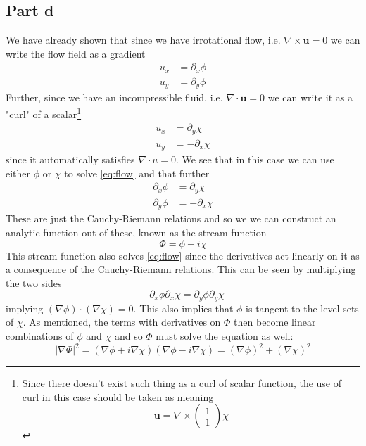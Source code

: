 \documentclass[a4paper,12pt]{article}
\begin{document}
\subsection*{Part d}
We have already shown that since we have irrotational flow, i.e. $\nabla\times \bm u=0$ we can write the flow field as a gradient
\begin{equation}
\begin{aligned}
	u_x&=\partial_x \phi\\
	u_y&=\partial_y \phi
\end{aligned}
\end{equation}
Further, since we have an incompressible fluid, i.e. $\nabla\cdot\bm  u=0$ we can write it as a "curl" of a scalar\footnote{Since there doesn't exist such thing as a curl of scalar function, the use of curl in this case should be taken as meaning \begin{equation}
\bm u=\nabla\times \begin{pmatrix}
1\\1
\end{pmatrix}\chi
\end{equation}}
\begin{equation}
\begin{aligned}
u_x&=\partial_y \chi\\
u_y&=-\partial_x \chi
\end{aligned}
\end{equation}
since it automatically satisfies $\nabla\cdot u=0$. We see that in this case we can use either $\phi$ or $\chi$ to solve \eqref{eq:flow} and that further
\begin{equation}
	\begin{aligned}
		\partial_x \phi&=\partial_y \chi\\
		\partial_y \phi&=-\partial_x \chi
	\end{aligned}
\end{equation}
These are just the Cauchy-Riemann relations and so we we can construct an analytic function out of these, known as the stream function
\begin{equation}
\Phi=\phi+i\chi
\end{equation}
This stream-function also solves \eqref{eq:flow} since the derivatives act linearly on it as a consequence of the Cauchy-Riemann relations. This can be seen by multiplying the two sides
\begin{equation}
-\partial_x\phi\partial_x\chi=\partial_y\phi\partial_y\chi
\end{equation}
implying $(\nabla\phi)\cdot (\nabla\chi)=0$. This also implies that $\phi$ is tangent to the level sets of $\chi$. As mentioned, the terms with derivatives on $\Phi$ then become linear combinations of $\phi$ and $\chi$ and so $\Phi$ must solve the equation as well:
\begin{equation}
|\nabla \Phi|^2=(\nabla \phi+i\nabla\chi)(\nabla \phi-i\nabla\chi)=(\nabla\phi)^2+(\nabla\chi)^2
\end{equation}
\end{document}
